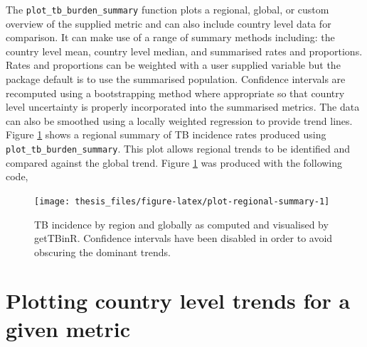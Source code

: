 \documentclass[11pt,twoside]{bristolthesis}
\begin{document}
  The \texttt{plot\_tb\_burden\_summary} function plots a regional, global, or custom overview of the supplied metric and can also include country level data for comparison. It can make use of a range of summary methods including: the country level mean, country level median, and summarised rates and proportions. Rates and proportions can be weighted with a user supplied variable but the package default is to use the summarised population. Confidence intervals are recomputed using a bootstrapping method where appropriate so that country level uncertainty is properly incorporated into the summarised metrics. The data can also be smoothed using a locally weighted regression to provide trend lines. Figure \ref{fig:plot-regional-summary} shows a regional summary of TB incidence rates produced using \texttt{plot\_tb\_burden\_summary}. This plot allows regional trends to be identified and compared against the global trend. Figure \ref{fig:plot-regional-summary} was produced with the following code,
  \begin{Shaded}
  \begin{Highlighting}[]
  \NormalTok{(} \NormalTok{, } \NormalTok{,}
                          \NormalTok{)}
  \end{Highlighting}
  \end{Shaded}
  \begin{figure}
  
  {\centering \texttt{[image: thesis\_files/figure-latex/plot-regional-summary-1]} 
  
  }
  
  \caption[TB incidence by region and globally as computed and visualised by getTBinR.]{TB incidence by region and globally as computed and visualised by getTBinR. Confidence intervals have been disabled in order to avoid obscuring the dominant trends.}\label{fig:plot-regional-summary}
  \end{figure}
  \hypertarget{plotting-country-level-trends-for-a-given-metric}{%
  \section{Plotting country level trends for a given metric}\label{plotting-country-level-trends-for-a-given-metric}}
  
\end{document}
